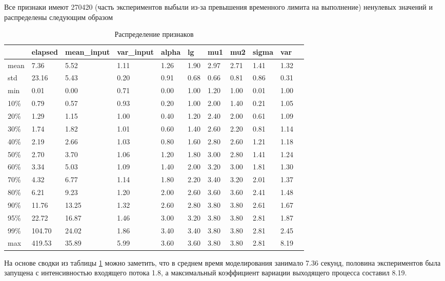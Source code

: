 Все признаки имеют 270420 (часть экспериментов выбыли из-за превышения временного лимита на выполнение) ненулевых значений и распределены следующим образом	
\begin{table}[H]
	\centering
	\caption{Распределение признаков}
	\label{table_feature_distr}
	\begin{tabular}{|l|l|l|l|l|l|l|l|l|l|l|}
		\hline
		& elapsed & mean\_input & var\_input &     alpha &        lg &       mu1 &       mu2 &     sigma &       var \\
		\hline
		mean & 7.36 &       5.52 & 1.11 &      1.26 &      1.90 &      2.97 &      2.71 &      1.41 &      1.32 \\
		\hline
		std & 23.16 &       5.43 & 0.20 &      0.91 &      0.68 &      0.66 &      0.81 &      0.86 &      0.31 \\
		\hline
		min & 0.01 &       0.00 & 0.71 &      0.00 &      1.00 &      1.20 &      1.00 &      0.01 &      1.00 \\
		\hline
		10\% & 0.79 &       0.57 & 0.93 &      0.20 &      1.00 &      2.00 &      1.40 &      0.21 &      1.05 \\
		\hline
		20\% & 1.29 &       1.15 & 1.00 &      0.40 &      1.20 &      2.40 &      2.00 &      0.61 &      1.09 \\
		\hline
		30\% & 1.74 &       1.82 & 1.01 &      0.60 &      1.40 &      2.60 &      2.20 &      0.81 &      1.14 \\
		\hline
		40\% & 2.19 &       2.66 & 1.03 &      0.80 &      1.60 &      2.80 &      2.60 &      1.21 &      1.18 \\
		\hline
		50\% & 2.70 &       3.70 & 1.06 &      1.20 &      1.80 &      3.00 &      2.80 &      1.41 &      1.24 \\
		\hline
		60\% & 3.34 &       5.03 & 1.09 &      1.40 &      2.00 &      3.20 &      3.00 &      1.81 &      1.30 \\
		\hline
		70\% & 4.32 &       6.77 & 1.14 &      1.80 &      2.20 &      3.40 &      3.20 &      2.01 &      1.37 \\
		\hline
		80\% & 6.21 &       9.23 & 1.20 &      2.00 &      2.60 &      3.60 &      3.60 &      2.41 &      1.48 \\
		\hline
		90\% & 11.76 &      13.25 & 1.32 &      2.60 &      2.80 &      3.80 &      3.80 &      2.61 &      1.67 \\
		\hline
		95\% & 22.72 &      16.87 & 1.46 &      3.00 &      3.20 &      3.80 &      3.80 &      2.81 &      1.87 \\
		\hline
		99\% & 104.70 &      24.02 & 1.86 &      3.40 &      3.40 &      3.80 &      3.80 &      2.81 &      2.45 \\
		\hline
		max & 419.53 &      35.89 & 5.99 &      3.60 &      3.60 &      3.80 &      3.80 &      2.81 &      8.19 \\
		\hline
	\end{tabular}
\end{table}
На основе сводки из таблицы \ref{table_feature_distr} можно заметить, что в среднем время моделирования занимало 7.36 секунд, половина экспериментов была запущена с интенсивностью входящего потока 1.8, а максимальный коэффициент вариации выходящего процесса составил 8.19.



